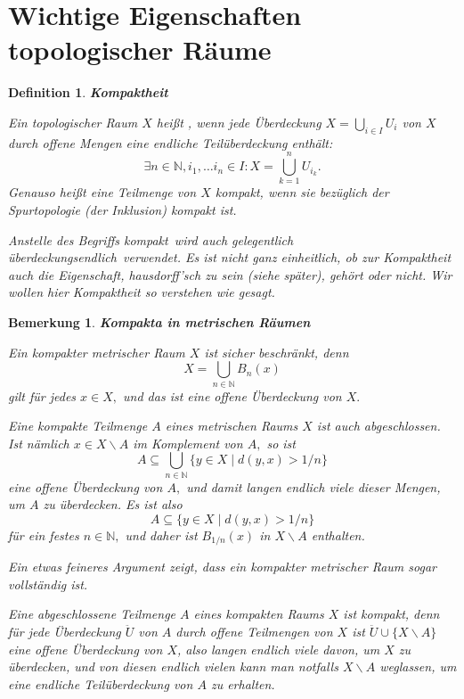 \documentclass[12pt]{book}   %
\newtheorem{bem}[alles]{Bemerkung}
\newtheorem{defini}[alles]{Definition}
\begin{document}
\section{Wichtige Eigenschaften topologischer R\"aume}
\begin{defini} {\bf Kompaktheit}

{\rm Ein topologischer Raum $X$ hei\ss t , wenn
jede \"Uberdeckung $X=\bigcup_{i\in I}U_i$ von $X$ durch offene Mengen eine
endliche Teil\"uberdeckung enth\"alt: 
$$\exists n\in \mathbb N, i_1,\dots i_n\in I: X=\bigcup_{k=1}^n U_{i_k}.$$
Genauso hei\ss t eine Teilmenge von $X$ kompakt, wenn sie bez\"uglich der 
Spurtopologie (der Inklusion) kompakt ist.

Anstelle des Begriffs \glqq kompakt\grqq\ wird auch gelegentlich 
\glqq \"uberdeckungsendlich\grqq\ verwendet. Es ist nicht ganz einheitlich, ob 
zur Kompaktheit auch die Eigenschaft, hausdorff'sch zu sein (siehe sp\"ater), 
geh\"ort oder 
nicht. Wir wollen hier Kompaktheit so verstehen wie gesagt.
}
\end{defini}
\begin{bem} {\bf Kompakta in metrischen R\"aumen}

{\rm Ein kompakter metrischer Raum $X$ ist sicher beschr\"ankt, denn 
$$X=\bigcup_{n\in \mathbb N} B_n(x)$$
gilt f\"ur jedes $x\in X,$ und das ist eine offene \"Uberdeckung von $X.$

Eine kompakte Teilmenge $A$ eines metrischen Raums $X$ ist 
auch abgeschlossen. Ist n\"amlich $x\in X\smallsetminus A$ im Komplement von 
$A,$ so ist 
$$A\subseteq \bigcup_{n\in \mathbb N} \{y\in X\mid d(y,x)> 1/n \}$$
eine offene \"Uberdeckung von $A,$ und damit langen endlich viele dieser
Mengen, um $A$ zu \"uberdecken. Es ist also 
$$A\subseteq \{y\in X\mid d(y,x)> 1/n \}$$
f\"ur ein festes $n\in \mathbb N,$ und daher ist $B_{1/n}(x)$ in 
$X\smallsetminus A$ enthalten.

Ein etwas feineres Argument zeigt, dass ein kompakter metrischer Raum sogar
vollst\"andig ist.

Eine abgeschlossene Teilmenge $A$ eines kompakten Raums $X$ ist kompakt, denn
f\"ur jede \"Uberdeckung $\ddot U$ von $A$ durch offene Teilmengen von $X$ 
ist $\ddot U\cup\{X\smallsetminus A\}$ eine offene \"Uberdeckung von $X$, also
langen endlich viele davon, um $X$ zu \"uberdecken, und von diesen endlich
vielen kann man notfalls $X\smallsetminus A$ weglassen, um eine endliche 
Teil\"uberdeckung von $A$ zu erhalten.


}

\end{bem}
\end{document}
